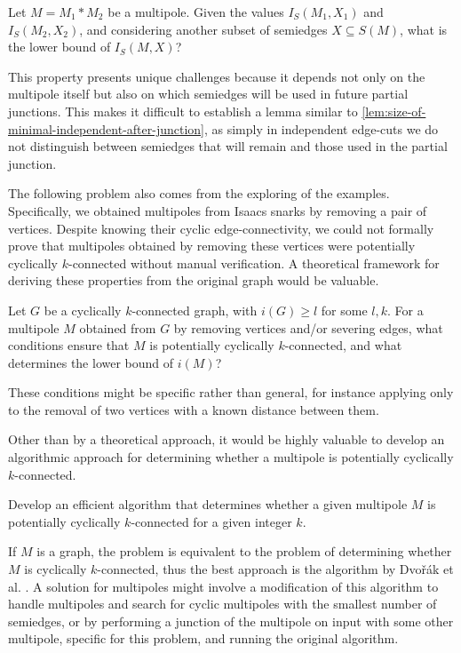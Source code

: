 \documentclass[12pt, twoside]{book}
\begin{document}
\begin{problem}
	Let $M=M_1*M_2$ be a multipole. Given the values $I_S(M_1,X_1)$ and $I_S(M_2,X_2)$, and considering another subset of semiedges $X\subseteq S(M)$, what is the lower bound of $I_S(M,X)$?
\end{problem}

This property presents unique challenges because it depends not only on the multipole itself but also on which semiedges will be used in future partial junctions. This makes it difficult to establish a lemma similar to \cref{lem:size-of-minimal-independent-after-junction}, as simply in independent edge-cuts we do not distinguish between semiedges that will remain and those used in the partial junction.

The following problem also comes from the exploring of the examples. Specifically, we obtained multipoles from Isaacs snarks by removing a pair of vertices. Despite knowing their cyclic edge-connectivity, we could not formally prove that multipoles obtained by removing these vertices were potentially cyclically $k$-connected without manual verification. A theoretical framework for deriving these properties from the original graph would be valuable.

\begin{problem}
	Let $G$ be a cyclically $k$-connected graph, with $i(G)\geq l$ for some $l,k$. For a multipole $M$ obtained from $G$ by removing vertices and/or severing edges, what conditions ensure that $M$ is potentially cyclically $k$-connected, and what determines the lower bound of $i(M)$?
\end{problem}

These conditions might be specific rather than general, for instance applying only to the removal of two vertices with a known distance between them.

Other than by a theoretical approach, it would be highly valuable to develop an algorithmic approach for determining whether a multipole is potentially cyclically $k$-connected.

\begin{problem}
	Develop an efficient algorithm that determines whether a given multipole $M$ is potentially cyclically $k$-connected for a given integer $k$.
\end{problem}

If $M$ is a graph, the problem is equivalent to the problem of determining whether $M$ is cyclically $k$-connected, thus the best approach is the algorithm by Dvořák et al. \cite{Dvorak2004}. A solution for multipoles might involve a modification of this algorithm to handle multipoles and search for cyclic multipoles with the smallest number of semiedges, or by performing a junction of the multipole on input with some other multipole, specific for this problem, and running the original algorithm.
\end{document}
